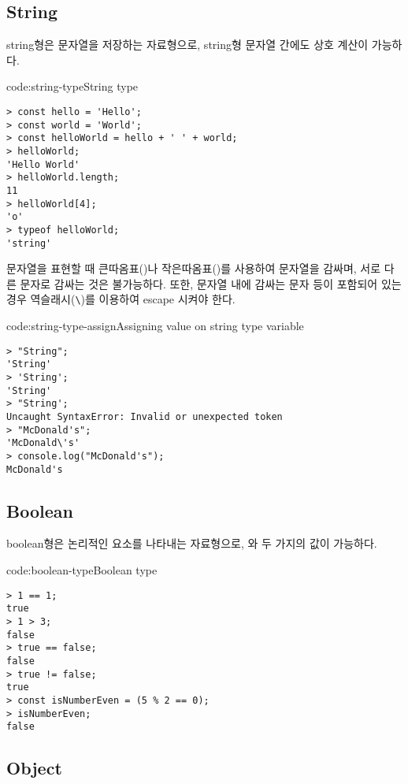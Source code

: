 \subsection*{String}

string형은 문자열을 저장하는 자료형으로, string형 문자열 간에도 상호 계산이 가능하다.

\begin{code}{code:string-type}{String type}
\begin{verbatim}
> const hello = 'Hello';
> const world = 'World';
> const helloWorld = hello + ' ' + world;
> helloWorld;
'Hello World'
> helloWorld.length;
11
> helloWorld[4];
'o'
> typeof helloWorld;
'string'
\end{verbatim}
\end{code}

문자열을 표현할 때 큰따옴표()나 작은따옴표()를 사용하여 문자열을 감싸며, 서로 다른 문자로 감싸는 것은 불가능하다. 또한, 문자열 내에 감싸는 문자 등이 포함되어 있는 경우 역슬래시(\verb|\|)를 이용하여 escape 시켜야 한다.

\begin{code}{code:string-type-assign}{Assigning value on string type variable}
\begin{verbatim}
> "String";
'String'
> 'String';
'String'
> "String';
Uncaught SyntaxError: Invalid or unexpected token
> "McDonald's";
'McDonald\'s'
> console.log("McDonald's");
McDonald's
\end{verbatim}
\end{code}

\subsection*{Boolean}

boolean형은 논리적인 요소를 나타내는 자료형으로, 와  두 가지의 값이 가능하다.

\begin{code}{code:boolean-type}{Boolean type}
\begin{verbatim}
> 1 == 1;
true
> 1 > 3;
false
> true == false;
false
> true != false;
true
> const isNumberEven = (5 % 2 == 0);
> isNumberEven;
false
\end{verbatim}
\end{code}

\subsection*{Object}

